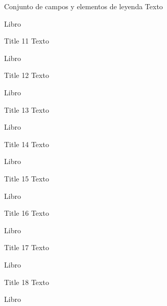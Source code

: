 \begin{frame}{Conjunto de campos y elementos de leyenda}
\justifying
Texto

{\tiny Libro}
\end{frame}

\begin{frame}{Title 11}
\justifying
Texto

{\tiny Libro}
\end{frame}

\begin{frame}{Title 12}
\justifying
Texto

{\tiny Libro}
\end{frame}

\begin{frame}{Title 13}
\justifying
Texto

{\tiny Libro}
\end{frame}

\begin{frame}{Title 14}
\justifying
Texto

{\tiny Libro}
\end{frame}

\begin{frame}{Title 15}
\justifying
Texto

{\tiny Libro}
\end{frame}

\begin{frame}{Title 16}
\justifying
Texto

{\tiny Libro}
\end{frame}

\begin{frame}{Title 17}
\justifying
Texto

{\tiny Libro}
\end{frame}

\begin{frame}{Title 18}
\justifying
Texto

{\tiny Libro}
\end{frame}